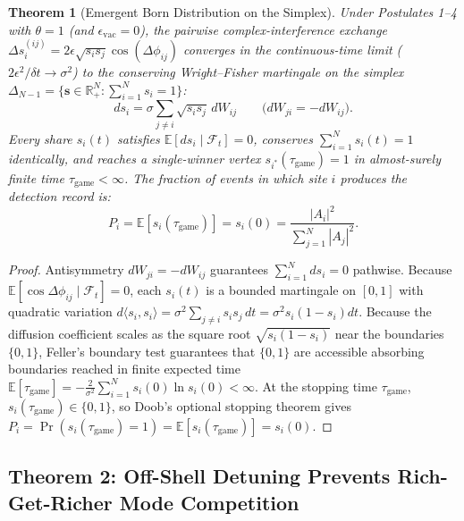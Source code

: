 \documentclass[11pt,a4paper]{article}
\newtheorem{theorem}{Theorem}
\begin{document}
\begin{theorem}[Emergent Born Distribution on the Simplex]
Under Postulates 1--4 with $\theta = 1$ (and $\epsilon_{\mathrm{vac}} = 0$), the pairwise complex-interference exchange $\Delta s_i^{(ij)} = 2\epsilon\sqrt{s_i s_j}\cos(\Delta\phi_{ij})$ converges in the continuous-time limit ($2\epsilon^2/\delta t \to \sigma^2$) to the conserving Wright--Fisher martingale on the simplex $\Delta_{N-1} = \{\mathbf{s} \in \mathbb{R}_+^N : \sum_{i=1}^N s_i = 1\}$:
\begin{equation}
    ds_i = \sigma \sum_{j \neq i} \sqrt{s_i s_j}\,dW_{ij} \qquad \big(dW_{ji} = -dW_{ij}\big).
\end{equation}
Every share $s_i(t)$ satisfies $\mathbb{E}[ds_i \mid \mathcal{F}_t] = 0$, conserves $\sum_{i=1}^N s_i(t) = 1$ identically, and reaches a single-winner vertex $s_{i^*}(\tau_{\mathrm{game}}) = 1$ in almost-surely finite time $\tau_{\mathrm{game}} < \infty$. The fraction of events in which site $i$ produces the detection record is:
\begin{equation}
    P_i = \mathbb{E}[s_i(\tau_{\mathrm{game}})] = s_i(0) = \frac{|A_i|^2}{\sum_{j=1}^N |A_j|^2}.
\end{equation}
\end{theorem}

\begin{proof}
Antisymmetry $dW_{ji} = -dW_{ij}$ guarantees $\sum_{i=1}^N ds_i = 0$ pathwise. Because $\mathbb{E}[\cos\Delta\phi_{ij} \mid \mathcal{F}_t] = 0$, each $s_i(t)$ is a bounded martingale on $[0, 1]$ with quadratic variation $d\langle s_i, s_i\rangle = \sigma^2 \sum_{j \neq i} s_i s_j\,dt = \sigma^2 s_i(1 - s_i)dt$. Because the diffusion coefficient scales as the square root $\sqrt{s_i(1-s_i)}$ near the boundaries $\{0, 1\}$, Feller's boundary test guarantees that $\{0, 1\}$ are accessible absorbing boundaries reached in finite expected time $\mathbb{E}[\tau_{\mathrm{game}}] = -\frac{2}{\sigma^2}\sum_{i=1}^N s_i(0)\ln s_i(0) < \infty$. At the stopping time $\tau_{\mathrm{game}}$, $s_i(\tau_{\mathrm{game}}) \in \{0, 1\}$, so Doob's optional stopping theorem gives $P_i = \Pr(s_i(\tau_{\mathrm{game}}) = 1) = \mathbb{E}[s_i(\tau_{\mathrm{game}})] = s_i(0)$.
\end{proof}

\subsection{Theorem 2: Off-Shell Detuning Prevents Rich-Get-Richer Mode Competition}
\end{document}
